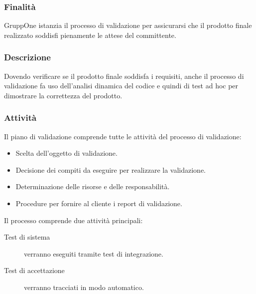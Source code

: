 \documentclass[../../norme-di-progetto.tex]{subfiles}
\begin{document}
\subsubsection{Finalità}%
\label{subs:validazione/finalita}

GruppOne istanzia il processo di validazione per assicurarsi che il prodotto finale realizzato soddisfi pienamente le attese del committente.

\subsubsection{Descrizione}%
\label{subs:validazione/descrizione}

Dovendo verificare se il prodotto finale soddisfa i requisiti, anche il processo di validazione fa uso dell'analisi dinamica del codice e quindi di test ad hoc per dimostrare la correttezza del prodotto.

\subsubsection{Attività}%
\label{subs:attivita}

Il piano di validazione comprende tutte le attività del processo di validazione:

\begin{itemize}
  \item Scelta dell'oggetto di validazione.
  \item Decisione dei compiti da eseguire per realizzare la validazione.
  \item Determinazione delle risorse e delle responsabilità.
  \item Procedure per fornire al cliente i report di validazione.
\end{itemize}

Il processo comprende due attività principali:

\begin{description}
\item [Test di sistema] verranno eseguiti tramite test di integrazione.
\item [Test di accettazione] verranno tracciati in modo automatico.
\end{description}
\end{document}
